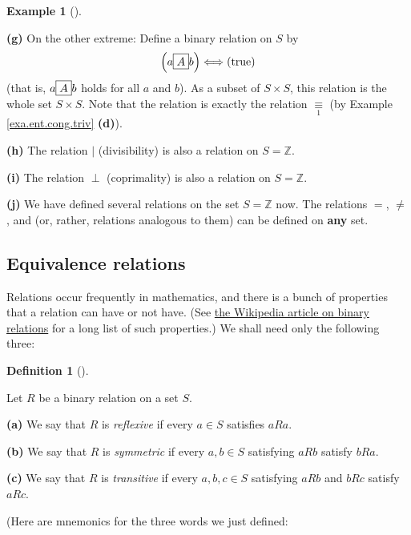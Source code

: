 \documentclass[numbers=enddot,12pt,final,onecolumn,notitlepage]{scrartcl}%
\numberwithin{exer}{subsection}
\theoremstyle{definition}
\newtheorem{defi}[theo]{Definition}
\newenvironment{definition}[1][]
{\begin{defi}[#1]\begin{leftbar}}
{\end{leftbar}\end{defi}}
\newtheorem{exam}[theo]{Example}
\newenvironment{example}[1][]
{\begin{exam}[#1]\begin{leftbar}}
{\end{leftbar}\end{exam}}
\begin{document}
\begin{example}
\textbf{(g)} On the other extreme: Define a binary relation  on $S$
by%
\[
\left(  a\fbox{$A$}b\right)  \Longleftrightarrow\left(  \text{true}\right)
\]
(that is, $a\fbox{$A$}b$ holds for all $a$ and $b$). As a subset of $S\times
S$, this relation  is the whole set $S\times S$. Note that the
relation  is exactly the relation $\underset{1}{\equiv}$ (by Example
\ref{exa.ent.cong.triv} \textbf{(d)}).

\textbf{(h)} The relation $\mid$ (divisibility) is also a relation on
$S=\mathbb{Z}$.

\textbf{(i)} The relation $\perp$ (coprimality) is also a relation on
$S=\mathbb{Z}$.

\textbf{(j)} We have defined several relations on the set $S=\mathbb{Z}$ now.
The relations $=$, $\neq$,  and  (or, rather, relations
analogous to them) can be defined on \textbf{any} set.
\end{example}

\subsection{Equivalence relations}

Relations occur frequently in mathematics, and there is a bunch of properties
that a relation can have or not have. (See
\href{https://en.wikipedia.org/wiki/Binary_relation}{the Wikipedia article on
binary relations} for a long list of such properties.) We shall need only the
following three:

\begin{definition}
\label{def.eqrel.rel.rst}Let $R$ be a binary relation on a set $S$.

\textbf{(a)} We say that $R$ is \textit{reflexive} if every $a\in S$ satisfies
$aRa$.

\textbf{(b)} We say that $R$ is \textit{symmetric} if every $a,b\in S$
satisfying $aRb$ satisfy $bRa$.

\textbf{(c)} We say that $R$ is \textit{transitive} if every $a,b,c\in S$
satisfying $aRb$ and $bRc$ satisfy $aRc$.
\end{definition}

(Here are mnemonics for the three words we just defined:
\end{document}
